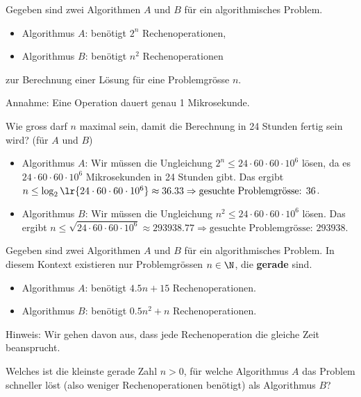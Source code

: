 \begin{frame}
\begin{myexercise}
Gegeben sind zwei Algorithmen \(A\) und \(B\) für ein algorithmisches Problem.
\begin{itemize}
	\item Algorithmus \(A\): benötigt \(2^n\) Rechenoperationen,
	\item Algorithmus \(B\): benötigt \(n^2\) Rechenoperationen
\end{itemize}
zur Berechnung einer Lösung für eine Problemgrösse \(n\).
\vspace{0.3cm}

Annahme: Eine Operation dauert genau 1 Mikrosekunde.
\vspace{0.5cm}

Wie gross darf $n$ maximal sein, damit die Berechnung in 24 Stunden fertig sein wird? (für $A$ und $B$)
\end{myexercise}
\end{frame}

\begin{frame}
\begin{myanswer}
\begin{itemize}
	\item Algorithmus \(A\): Wir müssen die Ungleichung \(2^n \leq 24 \cdot 60 \cdot 60 \cdot 10^6\) lösen, da es $24 \cdot 60 \cdot 60 \cdot 10^6$ Mikrosekunden in 24 Stunden gibt. Das ergibt \(n \leq \log_2\lr{24 \cdot 60 \cdot 60 \cdot 10^6} \approx 36.33\Rightarrow \text{gesuchte Problemgrösse: } 36 \).
	\item Algorithmus \(B\): Wir müssen die Ungleichung \(n^2 \leq 24 \cdot 60 \cdot 60 \cdot 10^6\) lösen. Das ergibt \(n \leq \sqrt{24 \cdot 60 \cdot 60 \cdot 10^6} \approx 293938.77 \Rightarrow \text{gesuchte Problemgrösse: } 293938\).
\end{itemize}
\end{myanswer}
\end{frame}

\begin{frame}
\begin{myexercise}
Gegeben sind zwei Algorithmen \(A\) und \(B\) für ein algorithmisches Problem. In diesem Kontext existieren nur Problemgrössen \(n \in \N\), die \textbf{gerade} sind.
\begin{itemize}
	\item Algorithmus \(A\): benötigt \(4.5n + 15\) Rechenoperationen.
	\item Algorithmus \(B\): benötigt \(0.5n^2 + n\) Rechenoperationen.
\end{itemize}
Hinweis: Wir gehen davon aus, dass jede Rechenoperation die gleiche Zeit beansprucht.\\
\vspace{0.5cm}

Welches ist die kleinste gerade Zahl \(n > 0\), für welche Algorithmus \(A\) das Problem schneller löst (also weniger Rechenoperationen benötigt) als Algorithmus \(B\)?
\end{myexercise}
\end{frame}

